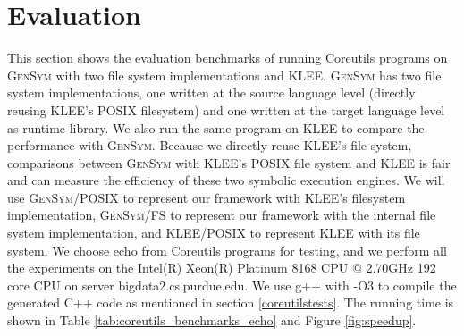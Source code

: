 \documentclass[sigplan, nonacm]{acmart}\settopmatter{printfolios=true,printccs=false,printacmref=false}
\newcommand{\tool}{\textsc{GenSym}\xspace}
\begin{document}
\section{Evaluation}\label{evaluation}
This section shows the evaluation benchmarks of running Coreutils programs on \tool with two file system implementations and KLEE. \tool has two file system implementations, one written at the source language level (directly reusing KLEE's POSIX filesystem) and one written at the target language level as runtime library. We also run the same program on KLEE to compare the performance with \tool. Because we directly reuse KLEE's file system, comparisons between \tool with KLEE's POSIX file system and KLEE is fair and can measure the efficiency of these two symbolic execution engines. We will use \tool/POSIX to represent our framework with KLEE's filesystem implementation, \tool/FS to represent our framework with the internal file system implementation, and KLEE/POSIX to represent KLEE with its file system. We choose echo from Coreutils programs for testing, and we perform all the experiments on the Intel(R) Xeon(R) Platinum 8168 CPU @ 2.70GHz 192 core CPU on server bigdata2.cs.purdue.edu. We use g++ with -O3 to compile the generated C++ code as mentioned in section \ref{coreutilstests}. The running time is shown in Table \ref{tab:coreutils_benchmarks_echo} and Figure \ref{fig:speedup}.\par
\end{document}
